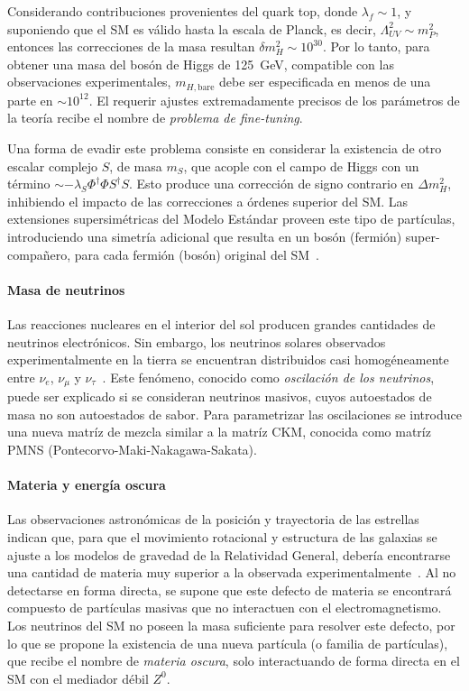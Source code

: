 Considerando contribuciones provenientes del quark top, donde $\lambda_f \sim 1$, y suponiendo que el SM es válido hasta la escala de Planck, es decir, $\Lambda_{UV}^2 \sim m_P^2$, entonces las correcciones de la masa resultan $\delta m_H^2 \sim 10^{30}$. Por lo tanto, para obtener una masa del bosón de Higgs de \SI{125}{\GeV}, compatible con las observaciones experimentales, $m_{H, \text{bare}}$ debe ser especificada en menos de una parte en $\sim 10^{12}$. El requerir ajustes extremadamente precisos de los parámetros de la teoría recibe el nombre de \textit{problema de fine-tuning}.

Una forma de evadir este problema consiste en considerar la existencia de otro escalar complejo $S$, de masa $m_S$, que acople con el campo de Higgs con un término $\sim - \lambda_S \Phi^\dagger \Phi S^\dagger S$. Esto produce una corrección de signo contrario en $\Delta m_H^2$, inhibiendo el impacto de las correcciones a órdenes superior del SM. Las extensiones supersimétricas del Modelo Estándar proveen este tipo de partículas, introduciendo una simetría adicional que resulta en un bosón (fermión) super-compañero, para cada fermión (bosón) original del SM~\cite{Haber2018}.


\paragraph{Masa de neutrinos}

Las reacciones nucleares en el interior del sol producen grandes cantidades de neutrinos electrónicos. Sin embargo, los neutrinos solares observados experimentalmente en la tierra se encuentran distribuidos casi homogéneamente entre $\nu_e$, $\nu_\mu$ y $\nu_\tau$~\cite{TheSuper-KamiokandeCollaboration1998}. Este fenómeno, conocido como \textit{oscilación de los neutrinos}, puede ser explicado si se consideran neutrinos masivos, cuyos autoestados de masa no son autoestados de sabor. Para parametrizar las oscilaciones se introduce una nueva matríz de mezcla similar a la matríz CKM, conocida como matríz PMNS (Pontecorvo-Maki-Nakagawa-Sakata).


\paragraph{Materia y energía oscura}

Las observaciones astronómicas de la posición y trayectoria de las estrellas indican que, para que el movimiento rotacional y estructura de las galaxias se ajuste a los modelos de gravedad de la Relatividad General, debería encontrarse una cantidad de materia muy superior a la observada experimentalmente~\cite{Duda2011}. Al no detectarse en forma directa, se supone que este defecto de materia se encontrará compuesto de partículas masivas que no interactuen con el electromagnetismo. Los neutrinos del SM no poseen la masa suficiente para resolver este defecto, por lo que se propone la existencia de una nueva partícula (o familia de partículas), que recibe el nombre de \textit{materia oscura}, solo interactuando de forma directa en el SM con el mediador débil $Z^0$.

